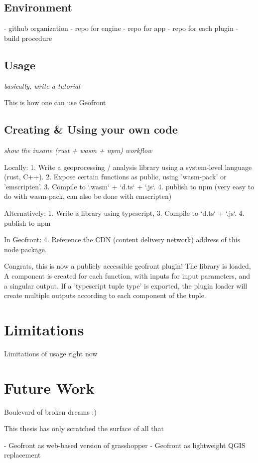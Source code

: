 \subsection{Environment}%
- github organization 
- repo for engine 
- repo for app 
- repo for each plugin
- build procedure

\subsection{Usage}%

\emph{basically, write a tutorial}

This is how one can use Geofront

\subsection{Creating \& Using your own code}
\emph{show the insane (rust + wasm + npm) workflow}

Locally: 
1. Write a geoprocessing / analysis library using a system-level language (rust, C++).
2. Expose certain functions as public, using 'wasm-pack' or 'emscripten'.
3. Compile to `.wasm` + `d.ts` + `.js`.
4. publish to npm (very easy to do with wasm-pack, can also be done with emscripten)

Alternatively: 
1. Write a library using typescript, 
3. Compile to `d.ts` + `.js`.
4. publish to npm 

In Geofront: 
4. Reference the CDN (content delivery network) address of this node package. 

Congrats, this is now a publicly accessible geofront plugin!
The library is loaded, A component is created for each function, with inputs for input parameters, and a singular output. If a 'typescript tuple type' is exported, the plugin loader will create multiple outputs according to each component of the tuple.

\section{Limitations}%

Limitations of usage right now



\section{Future Work}
Boulevard of broken dreams :) 

This thesis has only scratched the surface of all that

- Geofront as web-based version of grasshopper
- Geofront as lightweight QGIS replacement 

